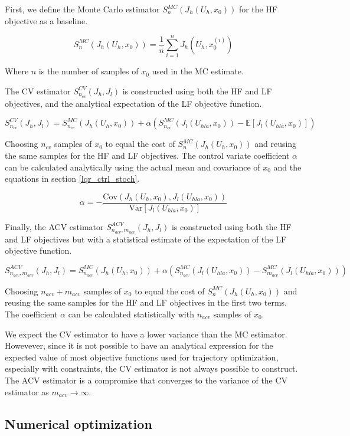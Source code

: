 \documentclass{article}
\begin{document}
First, we define the Monte Carlo estimator $S_n^{MC}(J_h(U_h, x_0))$ for the HF objective as a baseline.

$$
S_n^{MC}(J_h(U_h, x_0)) = \frac{1}{n} \sum_{i=1}^{n} J_h(U_h, x_0^{(i)})
$$

Where $n$ is the number of samples of $x_0$ used in the MC estimate.

The CV estimator $S_{n_{cv}}^{CV}(J_h, J_l)$ is constructed using both the HF and LF objectives, and the
analytical expectation of the LF objective function.

$$
S_{n_{cv}}^{CV}(J_h, J_l) = S_{n_{cv}}^{MC}(J_h(U_h, x_0)) + \alpha (S_{n_{cv}}^{MC}(J_l(U_{hla}, x_0)) - \mathbb{E}[J_l(U_{hla}, x_0)])
$$

Choosing $n_{cv}$ samples of $x_0$ to equal the cost of $S_n^{MC}(J_h(U_h, x_0))$ and reusing the same samples for the HF and LF objectives.
The control variate coefficient $\alpha$ can be calculated analytically using the actual mean and covariance of $x_0$
and the equations in section \ref{lqr_ctrl_stoch}.

$$
\alpha = -\frac{\text{Cov}(J_h(U_h, x_0), J_l(U_{hla}, x_0))}{\text{Var}[J_l(U_{hla}, x_0)]}
$$

Finally, the ACV estimator $S_{n_{acv},m_{acv}}^{ACV}(J_h, J_l)$ is constructed using both the HF and LF objectives but with
a statistical estimate of the expectation of the LF objective function.

$$
S_{n_{acv},m_{acv}}^{ACV}(J_h, J_l) = S_{n_{acv}}^{MC}(J_h(U_h, x_0)) + \alpha (S_{n_{acv}}^{MC}(J_l(U_{hla}, x_0)) - S_{m_{acv}}^{MC}(J_l(U_{hla}, x_0)))
$$

Choosing $n_{acv} + m_{acv}$ samples of $x_0$ to equal the cost of $S_n^{MC}(J_h(U_h, x_0))$ and reusing the same samples
for the HF and LF objectives in the first two terms. The coefficient $\alpha$ can be calculated statistically with $n_{acv}$ samples of $x_0$.

We expect the CV estimator to have a lower variance than the MC estimator. Howevever, since it is not possible
to have an analytical expression for the expected value of most objective functions used for trajectory optimization,
especially with constraints, the CV estimator is not always possible to construct. The ACV estimator is a compromise
that converges to the variance of the CV estimator as $m_{acv} \rightarrow \infty$.

\subsection{Numerical optimization}
\end{document}
